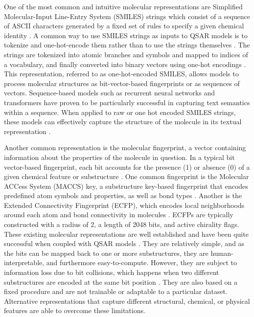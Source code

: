 One of the most common and intuitive molecular representations are Simplified Molecular-Input Line-Entry System (SMILES) strings which consist of a sequence of ASCII characters generated by a fixed set of rules to specify a given chemical identity \citep{Weininger1988}. A common way to use SMILES strings as inputs to QSAR models is to tokenize and one-hot-encode them rather than to use the strings themselves \citep{TeachOpenCADD2023}. The strings are tokenized into atomic branches and symbols and mapped to indices of a vocabulary, and finally converted into binary vectors using one-hot encodings \citep{TeachOpenCADD2023}. This representation, referred to as one-hot-encoded SMILES, allows models to process molecular structures as bit-vector-based fingerprints or as sequences of vectors. Sequence-based models such as recurrent neural networks and transformers have proven to be particularly successful in capturing text semantics within a sequence. When applied to raw or one hot encoded SMILES strings, these models can effectively capture the structure of the molecule in its textual representation \citep{TeachOpenCADD2023}. 

Another common representation is the molecular fingerprint, a vector containing information about the properties of the molecule in question. In a typical bit vector-based fingerprint, each bit accounts for the presence (1) or absence (0) of a given chemical feature or substructure \citep{Fassio2022}. One common fingerprint is the Molecular ACCess System (MACCS) key, a substructure key-based fingerprint that encodes predefined atom symbols and properties, as well as bond types \citep{Xie2020}. Another is the Extended Connectivity Fingerprint (ECFP), which encodes local neighborhoods around each atom and bond connectivity in molecules \citep{Xie2020}. ECFPs are typically constructed with a radius of 2, a length of 2048 bits, and active chirality flags. These existing molecular representations are well established and have been quite successful when coupled with QSAR models \citep{CortsCiriano2020, Sabando2021}. They are relatively simple, and as the bits can be mapped back to one or more substructures, they are human-interpretable, and furthermore easy-to-compute. However, they are subject to information loss due to bit collisions, which happens when two different substructures are encoded at the same bit position \citep{Fassio2022}. They are also based on a fixed procedure and are not trainable or adaptable to a particular dataset. Alternative representations that capture different structural, chemical, or physical features are able to overcome these limitations. 

